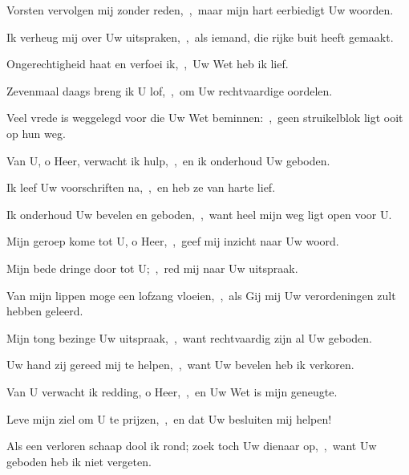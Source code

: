 \documentclass[12pt,twoside,a5paper]{article}
\begin{document}

\begin{halfparskip}
  Vorsten vervolgen mij zonder reden,~\sep\ maar mijn hart eerbiedigt Uw woorden.


  Ik verheug mij over Uw uitspraken,~\sep\ als iemand, die rijke buit heeft gemaakt.

  Ongerechtigheid haat en verfoei ik,~\sep\ Uw Wet heb ik lief.

  Zevenmaal daags breng ik U lof,~\sep\ om Uw rechtvaardige oordelen.

  Veel vrede is weggelegd voor die Uw Wet beminnen:~\sep\ geen struikelblok ligt ooit op hun weg.

  Van U, o Heer, verwacht ik hulp,~\sep\ en ik onderhoud Uw geboden.

  Ik leef Uw voorschriften na,~\sep\ en heb ze van harte lief.

  Ik onderhoud Uw bevelen en geboden,~\sep\ want heel mijn weg ligt open voor U.

   Mijn geroep kome tot U, o Heer,~\sep\ geef mij inzicht naar Uw woord.

  Mijn bede dringe door tot U;~\sep\ red mij naar Uw uitspraak.

  Van mijn lippen moge een lofzang vloeien,~\sep\ als Gij mij Uw verordeningen zult hebben geleerd.

  Mijn tong bezinge Uw uitspraak,~\sep\ want rechtvaardig zijn al Uw geboden.

  Uw hand zij gereed mij te helpen,~\sep\ want Uw bevelen heb ik verkoren.

  Van U verwacht ik redding, o Heer,~\sep\ en Uw Wet is mijn geneugte.

  Leve mijn ziel om U te prijzen,~\sep\ en dat Uw besluiten mij helpen!

  Als een verloren schaap dool ik rond; zoek toch Uw dienaar op,~\sep\ want Uw geboden heb ik niet vergeten.
\end{halfparskip}

\begin{halfparskip}
   
\end{halfparskip}


\end{document}
